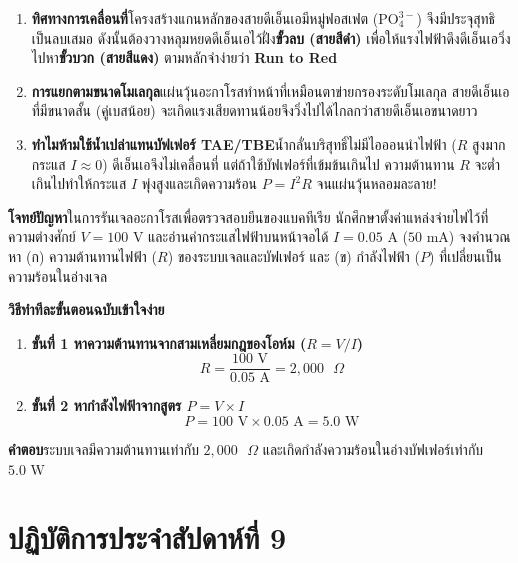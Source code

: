 \begin{bioappbox}
\begin{enumerate}
    \item \textbf{ทิศทางการเคลื่อนที่}\quad โครงสร้างแกนหลักของสายดีเอ็นเอมีหมู่ฟอสเฟต ($\text{PO}_4^{3-}$) จึงมีประจุสุทธิเป็นลบเสมอ ดังนั้นต้องวางหลุมหยดดีเอ็นเอไว้ฝั่ง\textbf{ขั้วลบ (สายสีดำ)} เพื่อให้แรงไฟฟ้าดึงดีเอ็นเอวิ่งไปหา\textbf{ขั้วบวก (สายสีแดง)} ตามหลักจำง่ายว่า \textbf{Run to Red}
    \item \textbf{การแยกตามขนาดโมเลกุล}\quad แผ่นวุ้นอะกาโรสทำหน้าที่เหมือนตาข่ายกรองระดับโมเลกุล สายดีเอ็นเอที่มีขนาดสั้น (คู่เบสน้อย) จะเกิดแรงเสียดทานน้อยจึงวิ่งไปได้ไกลกว่าสายดีเอ็นเอขนาดยาว
    \item \textbf{ทำไมห้ามใช้น้ำเปล่าแทนบัฟเฟอร์ TAE/TBE}\quad น้ำกลั่นบริสุทธิ์ไม่มีไอออนนำไฟฟ้า ($R$ สูงมาก กระแส $I \approx 0$) ดีเอ็นเอจึงไม่เคลื่อนที่ แต่ถ้าใช้บัฟเฟอร์ที่เข้มข้นเกินไป ความต้านทาน $R$ จะต่ำเกินไปทำให้กระแส $I$ พุ่งสูงและเกิดความร้อน $P = I^2R$ จนแผ่นวุ้นหลอมละลาย!
\end{enumerate}
\end{bioappbox}

\begin{worked}
\textbf{โจทย์ปัญหา}\quad ในการรันเจลอะกาโรสเพื่อตรวจสอบยีนของแบคทีเรีย นักศึกษาตั้งค่าแหล่งจ่ายไฟไว้ที่ความต่างศักย์ $V = 100\text{ V}$ และอ่านค่ากระแสไฟฟ้าบนหน้าจอได้ $I = 0.05\text{ A}$ ($50\text{ mA}$) จงคำนวณหา (ก) ความต้านทานไฟฟ้า ($R$) ของระบบเจลและบัฟเฟอร์ และ (ข) กำลังไฟฟ้า ($P$) ที่เปลี่ยนเป็นความร้อนในอ่างเจล

\textbf{วิธีทำทีละขั้นตอนฉบับเข้าใจง่าย}
\begin{enumerate}
    \item \textbf{ขั้นที่ 1 หาความต้านทานจากสามเหลี่ยมกฎของโอห์ม ($R = V / I$)}
    \[
        R = \frac{100\text{ V}}{0.05\text{ A}} = 2{,}000\text{ }\Omega
    \]
    \item \textbf{ขั้นที่ 2 หากำลังไฟฟ้าจากสูตร $P = V \times I$}
    \[
        P = 100\text{ V} \times 0.05\text{ A} = 5.0\text{ W}
    \]
\end{enumerate}
\textbf{คำตอบ}\quad ระบบเจลมีความต้านทานเท่ากับ $2{,}000\text{ }\Omega$ และเกิดกำลังความร้อนในอ่างบัฟเฟอร์เท่ากับ $5.0\text{ W}$
\end{worked}

\section{ปฏิบัติการประจำสัปดาห์ที่ 9}

